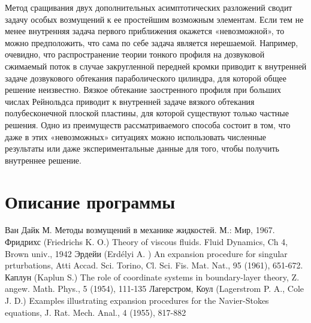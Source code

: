 \documentclass[12pt,a4paper,titlepage]{article}
\theoremstyle{definition}
\theoremstyle{remark}
\begin{document}
  Метод сращивания двух дополнительных
  асимптотических разложений сводит задачу особых возмущений
  к ее простейшим возможным элементам.
  Если тем не менее внутренняя задача первого приближения 
  окажется «невозможной», то можно предположить, что сама
  по себе задача является нерешаемой. 
  Например, очевидно, что распространение теории тонкого профиля
  на дозвуковой сжимаемый поток в случае 
  закругленной передней кромки приводит к внутренней задаче
  дозвукового обтекания параболического цилиндра, для
  которой общее решение неизвестно. 
  Вязкое обтекание
  заостренного профиля при больших числах Рейнольдса
  приводит к внутренней задаче вязкого обтекания
  полубесконечной плоской пластины, для которой существуют
  только частные решения.
  Одно из преимуществ 
  рассматриваемого способа состоит в том, что даже в этих
  «невозможных» ситуациях можно использовать численные
  результаты или даже экспериментальные данные для
  того, чтобы получить внутреннее решение.
  
\section{Описание программы}

\begin{thebibliography}{9}
     Ван Дайк М.
      Методы возмущений в механике жидкостей. М.: Мир, 1967.
     Фридрихс (Friedrichs K. O.)
      Theory of viscous fluids.
      Fluid Dynamics, Ch 4,
      Brown univ., 1942
     Эрдейи (Erd\'elyi A. )
      An expansion procedure for singular prturbations,
      Atti Accad.
      Sci. Torino, Cl. Sci. Fis. Mat. Nat., 95 (1961), 651-672.
     Каплун (Kaplun S.)
      The role of coordinate systems in boundary-layer theory,
      Z. angew. Math. Phys., 5 (1954), 111-135
     Лагерстром, Коул (Lagerstrom P. A., Cole J. D.)
      Examples illustrating expansion procedures for the Navier-Stokes equations,
      J. Rat. Mech. Anal., 4 (1955), 817-882
\end{thebibliography}

    \clearpage
\end{document}
